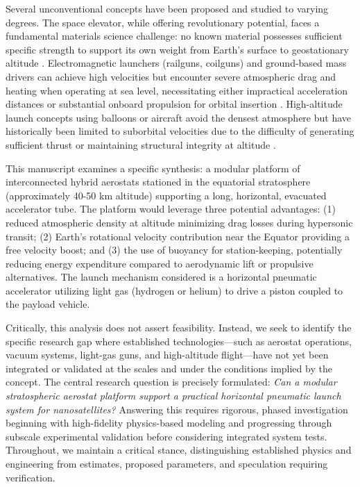 \documentclass[12pt]{article}
\begin{document}
Several unconventional concepts have been proposed and studied to varying degrees. The space elevator, while offering revolutionary potential, faces a fundamental materials science challenge: no known material possesses sufficient specific strength to support its own weight from Earth's surface to geostationary altitude \cite{edwards2003}. Electromagnetic launchers (railguns, coilguns) and ground-based mass drivers can achieve high velocities but encounter severe atmospheric drag and heating when operating at sea level, necessitating either impractical acceleration distances or substantial onboard propulsion for orbital insertion \cite{miller2013}. High-altitude launch concepts using balloons or aircraft avoid the densest atmosphere but have historically been limited to suborbital velocities due to the difficulty of generating sufficient thrust or maintaining structural integrity at altitude \cite{brown2002}.

This manuscript examines a specific synthesis: a modular platform of interconnected hybrid aerostats stationed in the equatorial stratosphere (approximately 40-50 km altitude) supporting a long, horizontal, evacuated accelerator tube. The platform would leverage three potential advantages: (1) reduced atmospheric density at altitude minimizing drag losses during hypersonic transit; (2) Earth's rotational velocity contribution near the Equator providing a free velocity boost; and (3) the use of buoyancy for station-keeping, potentially reducing energy expenditure compared to aerodynamic lift or propulsive alternatives. The launch mechanism considered is a horizontal pneumatic accelerator utilizing light gas (hydrogen or helium) to drive a piston coupled to the payload vehicle.

Critically, this analysis does not assert feasibility. Instead, we seek to identify the specific research gap where established technologies—such as aerostat operations, vacuum systems, light-gas guns, and high-altitude flight—have not yet been integrated or validated at the scales and under the conditions implied by the concept. The central research question is precisely formulated: \emph{Can a modular stratospheric aerostat platform support a practical horizontal pneumatic launch system for nanosatellites?} Answering this requires rigorous, phased investigation beginning with high-fidelity physics-based modeling and progressing through subscale experimental validation before considering integrated system tests. Throughout, we maintain a critical stance, distinguishing established physics and engineering from estimates, proposed parameters, and speculation requiring verification.
\end{document}
